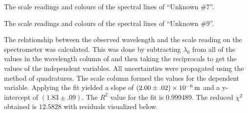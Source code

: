 \begin{paper}
{The scale readings and colours of the spectral lines of ``Unknown \#7''.}

{The scale readings and colours of the spectral lines of ``Unknown \#9''.}


The relationship between the observed wavelength and the
scale reading on the spectrometer was calculated.
This was done by subtracting $\lambda_0$ from all of the values in the wavelength column of
\figHelium and then taking the reciprocals to get the values of the independent
variables.
All uncertainties were propagated using the method of quadratures.
The scale column formed the values for the dependent variable.
Applying the fit yielded a slope of $(2.00\pm.02)\times\SI{E-6}{\meter}$ and a
y-intercept of $(1.83\pm.09)$.
The $R^2$ value for the fit is 0.999489.
The reduced $ \chi^2 $ obtained is $12.5828$ with residuals visualized below.


\end{paper}
